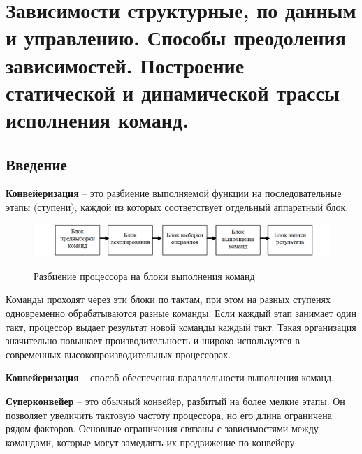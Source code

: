 


	
	\tableofcontents
	\newpage
	
	\section{Зависимости структурные, по данным и управлению. Способы преодоления зависимостей. Построение статической и динамической трассы исполнения команд.}
	\vspace{-1em}
	\subsection{Введение}
	\vspace{-0.5em}
	\textbf{Конвейеризация} -- это разбиение выполняемой функции на последовательные этапы (ступени), каждой из которых соответствует отдельный аппаратный блок.
	
	\vspace{-1em}
	\begin{figure}[H]
		\centering
		\includegraphics[width=1\linewidth, height=0.075\textheight]{img/01_01}
		\par
		{\small Разбиение процессора на блоки выполнения команд}
		\label{fig:01_01}
	\end{figure}
	\vspace{-1em}
	
	Команды проходят через эти блоки по тактам, при этом на разных ступенях одновременно обрабатываются разные команды. Если каждый этап занимает один такт, процессор выдает результат новой команды каждый такт. Такая организация значительно повышает производительность и широко используется в современных высокопроизводительных процессорах.
	\par\vspace{0.5em}
	\textbf{Конвейеризация} -- способ обеспечения параллельности выполнения команд.
	
	\textbf{Суперконвейер} -- это обычный конвейер, разбитый на более мелкие этапы. Он позволяет увеличить тактовую частоту процессора, но его длина ограничена рядом факторов. Основные ограничения связаны с зависимостями между командами, которые могут замедлять их продвижение по конвейеру.
	
	\par\vspace{0.5em}
	
